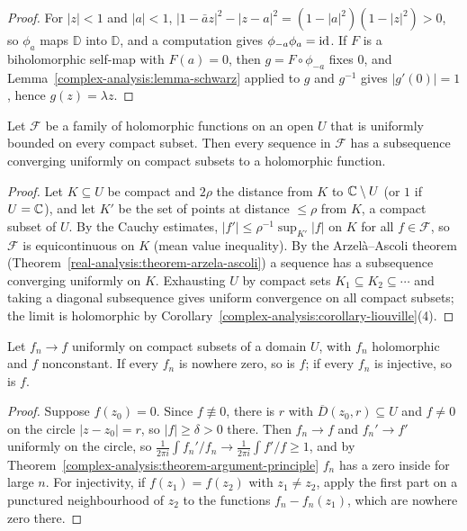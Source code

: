\begin{proof}
For $|z| < 1$ and $|a| < 1$, $|1 - \bar az|^2 - |z - a|^2 = (1 - |a|^2)(1 - |z|^2) > 0$, so $\phi_a$ maps $\mathbb{D}$ into $\mathbb{D}$, and a computation gives $\phi_{-a}\phi_a = \mathrm{id}$. If $F$ is a biholomorphic
self-map with $F(a) = 0$, then $g = F \circ \phi_{-a}$ fixes $0$, and Lemma~\ref{complex-analysis:lemma-schwarz} applied to $g$ and $g^{-1}$ gives $|g'(0)| = 1$, hence $g(z) = \lambda z$.
\end{proof}

\begin{theorem}[Montel]\label{complex-analysis:theorem-montel}
Let $\mathcal{F}$ be a family of holomorphic functions on an open $U$ that is uniformly bounded on every compact subset. Then every sequence in $\mathcal{F}$ has a subsequence converging uniformly on compact
subsets to a holomorphic function.
\end{theorem}

\begin{proof}
Let $K \subseteq U$ be compact and $2\rho$ the distance from $K$ to $\mathbb{C} \setminus U$ (or $1$ if $U = \mathbb{C}$), and let $K'$ be the set of points at distance $\leq \rho$ from $K$, a compact subset of $U$. By the
Cauchy estimates, $|f'| \leq \rho^{-1}\sup_{K'}|f|$ on $K$ for all $f \in \mathcal{F}$, so $\mathcal{F}$ is equicontinuous on $K$ (mean value inequality). By the Arzel\`a--Ascoli theorem
(Theorem~\ref{real-analysis:theorem-arzela-ascoli}) a sequence has a subsequence converging uniformly on $K$. Exhausting $U$ by compact sets $K_1 \subseteq K_2 \subseteq \cdots$ and taking a diagonal
subsequence gives uniform convergence on all compact subsets; the limit is holomorphic by Corollary~\ref{complex-analysis:corollary-liouville}(4).
\end{proof}

\begin{theorem}[Hurwitz]\label{complex-analysis:theorem-hurwitz}
Let $f_n \to f$ uniformly on compact subsets of a domain $U$, with $f_n$ holomorphic and $f$ nonconstant. If every $f_n$ is nowhere zero, so is $f$; if every $f_n$ is injective, so is $f$.
\end{theorem}

\begin{proof}
Suppose $f(z_0) = 0$. Since $f \not\equiv 0$, there is $r$ with $\overline{D}(z_0, r) \subseteq U$ and $f \neq 0$ on the circle $|z - z_0| = r$, so $|f| \geq \delta > 0$ there. Then $f_n \to f$ and $f_n' \to f'$
uniformly on the circle, so $\frac{1}{2\pi i}\int f_n'/f_n \to \frac{1}{2\pi i}\int f'/f \geq 1$, and by Theorem~\ref{complex-analysis:theorem-argument-principle} $f_n$ has a zero inside for large $n$. For
injectivity, if $f(z_1) = f(z_2)$ with $z_1 \neq z_2$, apply the first part on a punctured neighbourhood of $z_2$ to the functions $f_n - f_n(z_1)$, which are nowhere zero there.
\end{proof}

